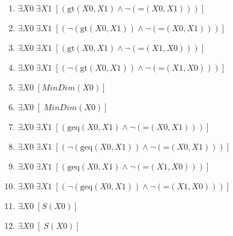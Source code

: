 \documentclass{article}
\begin{document}
\begin{enumerate}
\item $\exists X0\; \exists X1\;  \left[ \left(\textrm{gt}(X0,X1) \land \neg \left(\textrm{=}(X0,X1)\right)\right) \right]$
\item $\exists X0\; \exists X1\;  \left[ \left(\neg \left(\textrm{gt}(X0,X1)\right) \land \neg \left(\textrm{=}(X0,X1)\right)\right) \right]$
\item $\exists X0\; \exists X1\;  \left[ \left(\textrm{gt}(X0,X1) \land \neg \left(\textrm{=}(X1,X0)\right)\right) \right]$
\item $\exists X0\; \exists X1\;  \left[ \left(\neg \left(\textrm{gt}(X0,X1)\right) \land \neg \left(\textrm{=}(X1,X0)\right)\right) \right]$
\item $\exists X0\;  \left[ MinDim(X0) \right]$
\item $\exists X0\;  \left[ ~MinDim(X0) \right]$
\item $\exists X0\; \exists X1\;  \left[ \left(\textrm{geq}(X0,X1) \land \neg \left(\textrm{=}(X0,X1)\right)\right) \right]$
\item $\exists X0\; \exists X1\;  \left[ \left(\neg \left(\textrm{geq}(X0,X1)\right) \land \neg \left(\textrm{=}(X0,X1)\right)\right) \right]$
\item $\exists X0\; \exists X1\;  \left[ \left(\textrm{geq}(X0,X1) \land \neg \left(\textrm{=}(X1,X0)\right)\right) \right]$
\item $\exists X0\; \exists X1\;  \left[ \left(\neg \left(\textrm{geq}(X0,X1)\right) \land \neg \left(\textrm{=}(X1,X0)\right)\right) \right]$
\item $\exists X0\;  \left[ S(X0) \right]$
\item $\exists X0\;  \left[ ~S(X0) \right]$
\end{enumerate}
\end{document}

